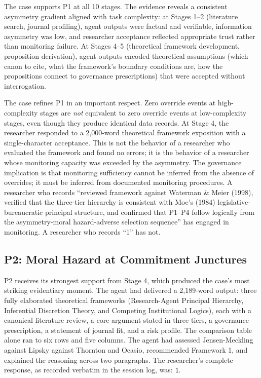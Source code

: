 \documentclass[12pt]{article}
\begin{document}
The case supports P1 at all 10 stages. The evidence reveals a consistent asymmetry gradient
aligned with task complexity: at Stages 1--2 (literature search, journal profiling), agent
outputs were factual and verifiable, information asymmetry was low, and researcher acceptance
reflected appropriate trust rather than monitoring failure. At Stages 4--5 (theoretical
framework development, proposition derivation), agent outputs encoded theoretical assumptions
(which canon to cite, what the framework's boundary conditions are, how the propositions
connect to governance prescriptions) that were accepted without interrogation.

The case refines P1 in an important respect. Zero override events at high-complexity
stages are \emph{not} equivalent to zero override events at low-complexity stages, even
though they produce identical data records. At Stage 4, the researcher responded to a
2,000-word theoretical framework exposition with a single-character acceptance. This is not
the behavior of a researcher who evaluated the framework and found no errors; it is the
behavior of a researcher whose monitoring capacity was exceeded by the asymmetry. The
governance implication is that monitoring sufficiency cannot be inferred from the absence
of overrides; it must be inferred from documented monitoring procedures. A researcher who
records ``reviewed framework against Waterman \& Meier (1998), verified that the
three-tier hierarchy is consistent with Moe's (1984) legislative-bureaucratic principal
structure, and confirmed that P1--P4 follow logically from the asymmetry-moral hazard-adverse
selection sequence'' has engaged in monitoring. A researcher who records ``1'' has not.

\subsection{P2: Moral Hazard at Commitment Junctures}

P2 receives its strongest support from Stage 4, which produced the case's most striking
evidentiary moment. The agent had delivered a 2,189-word output: three fully elaborated
theoretical frameworks (Research-Agent Principal Hierarchy, Inferential Discretion Theory,
and Competing Institutional Logics), each with a canonical literature review, a core
argument stated in three tiers, a governance prescription, a statement of journal fit, and a
risk profile. The comparison table alone ran to six rows and five columns. The agent had
assessed Jensen-Meckling against Lipsky against Thornton and Ocasio, recommended Framework 1,
and explained the reasoning across two paragraphs. The researcher's complete response, as
recorded verbatim in the session log, was: \texttt{1}.
\end{document}

